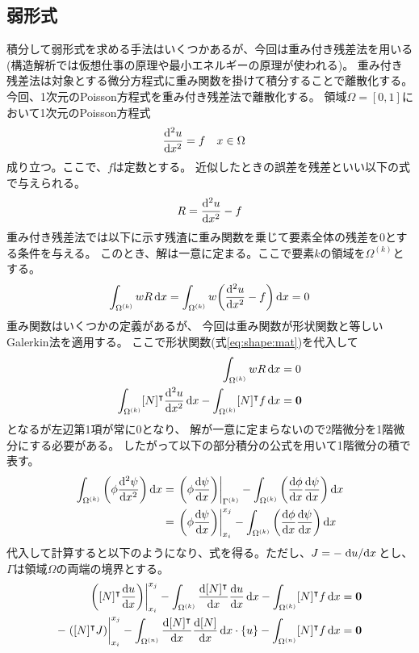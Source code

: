 \documentclass[paper=a4]{jlreq}
\begin{document}
\subsection{弱形式}
積分して弱形式を求める手法はいくつかあるが、今回は重み付き残差法を用いる
(構造解析では仮想仕事の原理や最小エネルギーの原理が使われる)。
重み付き残差法は対象とする微分方程式に重み関数を掛けて積分することで離散化する。
今回、1次元のPoisson方程式を重み付き残差法で離散化する。
領域$\Omega = [0,1]$において1次元のPoisson方程式
\begin{align}
    \dv[2]{u}{x} & = f \quad x \in \Omega \label{eq:poisson}
\end{align}
成り立つ。ここで、$f$は定数とする。
近似したときの誤差を残差といい以下の式で与えられる。
\begin{align}
    R = \dv[2]{u}{x} - f    \label{eq:residal}
\end{align}
重み付き残差法では以下に示す残渣に重み関数を乗じて要素全体の残差を0とする条件を与える。
このとき、解は一意に定まる。ここで要素$k$の領域を$\Omega^{(k)}$とする。
\begin{align}
    \int_{\Omega^{(k)}} wR\dd{x} = \int_{\Omega^{(k)}} w\qty( \dv[2]{u}{x} - f)\dd{x} = 0
    \label{eq:weighted-residual}
\end{align}
重み関数はいくつかの定義があるが、
今回は重み関数が形状関数と等しいGalerkin法を適用する。
ここで形状関数(式\eqref{eq:shape:mat})を代入して
\begin{align*}
    \int_{\Omega^{(k)}} wR\dd{x} &= 0\\
    \int_{\Omega^{(k)}} [N]^\intercal \dv[2]{u}{x}\dd{x} 
    - \int_{\Omega^{(k)}} [N]^\intercal f\dd{x} &= \vb*{0}
\end{align*}
となるが左辺第1項が常に0となり、
解が一意に定まらないので2階微分を1階微分にする必要がある。
したがって以下の部分積分の公式を用いて1階微分の積で表す。
\begin{align*}
    \begin{split}
    \int_{\Omega^{(k)}} \qty(\phi\dv[2]{\psi}{x}) \dd{x} &=
    \eval{\qty(\phi\dv{\psi}{x})}_{\Gamma^{(k)}}
    - \int_{\Omega^{(k)}} \qty(\dv{\phi}{x}\dv{\psi}{x}) \dd{x}\\
     &= \eval{\qty(\phi\dv{\psi}{x})}_{x_i}^{x_j}
    - \int_{\Omega^{(k)}} \qty(\dv{\phi}{x}\dv{\psi}{x}) \dd{x}
    \end{split}
\end{align*}
代入して計算すると以下のようになり、式を得る。ただし、$J=-\dv*{u}{x}$とし、
$\Gamma$は領域$\Omega$の両端の境界とする。
\begin{align}
    \eval{\qty([N]^\intercal\dv{u}{x})}_{x_i}^{x_j} 
    - \int_{\Omega^{(k)}} \dv{[N]^\intercal}{x} \dv{u}{x}\dd{x}
    - \int_{\Omega^{(k)}} [N]^\intercal f\dd{x} &= \vb*{0} \notag\\
    -\eval{\qty([N]^\intercal J)}_{x_i}^{x_j}
    - \int_{\Omega^{(n)}} \dv{[N]^\intercal}{x} \dv{[N]}{x}\dd{x}\cdot\{u\}
    - \int_{\Omega^{(n)}} [N]^\intercal f\dd{x} &= \vb*{0} \label{eq:weak_form}
\end{align}
\end{document}
